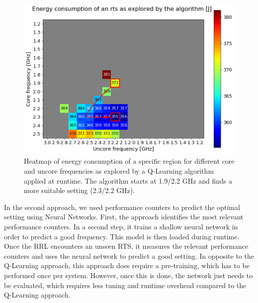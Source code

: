 \begin{figure}[!t]
\centering
\includegraphics[width=.8\columnwidth]{figures/q_learning.png}
\caption{Heatmap of energy consumption of a specific region for different core and uncore frequencies as explored by a Q-Learning algorithm applied at runtime. The algorithm starts at 1.9/2.2 GHz and finds a more suitable setting (2.3/2.2 GHz).}
\label{fig:qlearning}
\end{figure}

In the second approach, we used performance counters to predict the optimal setting using Neural Networks. First, the approach identifies the most relevant performance counters. In a second step, it trains a shallow neural network in order to predict a good frequency. This model is then loaded during runtime. Once the RRL encounters an unseen RTS, it measures the relevant performance counters and uses the neural network to predict a good setting. In opposite to the Q-Learning approach, this approach does require a pre-training, which has to be performed once per system. However, once this is done, the network just needs to be evaluated, which requires less tuning and runtime overhead compared to the Q-Learning approach. 


